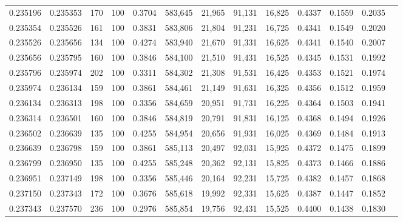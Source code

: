 \begin{tabular}{rrrrrrrrrrrrr}
0.235196 & 0.235353 &   170 & 100 &                                     0.3704 & 583,645 &  21,965 &  91,131 &  16,825 & 0.4337 & 0.1559 & 0.2035 \\
0.235354 & 0.235526 &   161 & 100 &                                     0.3831 & 583,806 &  21,804 &  91,231 &  16,725 & 0.4341 & 0.1549 & 0.2020 \\
0.235526 & 0.235656 &   134 & 100 &                                     0.4274 & 583,940 &  21,670 &  91,331 &  16,625 & 0.4341 & 0.1540 & 0.2007 \\
0.235656 & 0.235795 &   160 & 100 &                                     0.3846 & 584,100 &  21,510 &  91,431 &  16,525 & 0.4345 & 0.1531 & 0.1992 \\
0.235796 & 0.235974 &   202 & 100 &                                     0.3311 & 584,302 &  21,308 &  91,531 &  16,425 & 0.4353 & 0.1521 & 0.1974 \\
0.235974 & 0.236134 &   159 & 100 &                                     0.3861 & 584,461 &  21,149 &  91,631 &  16,325 & 0.4356 & 0.1512 & 0.1959 \\
0.236134 & 0.236313 &   198 & 100 &                                     0.3356 & 584,659 &  20,951 &  91,731 &  16,225 & 0.4364 & 0.1503 & 0.1941 \\
0.236314 & 0.236501 &   160 & 100 &                                     0.3846 & 584,819 &  20,791 &  91,831 &  16,125 & 0.4368 & 0.1494 & 0.1926 \\
0.236502 & 0.236639 &   135 & 100 &                                     0.4255 & 584,954 &  20,656 &  91,931 &  16,025 & 0.4369 & 0.1484 & 0.1913 \\
0.236639 & 0.236798 &   159 & 100 &                                     0.3861 & 585,113 &  20,497 &  92,031 &  15,925 & 0.4372 & 0.1475 & 0.1899 \\
0.236799 & 0.236950 &   135 & 100 &                                     0.4255 & 585,248 &  20,362 &  92,131 &  15,825 & 0.4373 & 0.1466 & 0.1886 \\
0.236951 & 0.237149 &   198 & 100 &                                     0.3356 & 585,446 &  20,164 &  92,231 &  15,725 & 0.4382 & 0.1457 & 0.1868 \\
0.237150 & 0.237343 &   172 & 100 &                                     0.3676 & 585,618 &  19,992 &  92,331 &  15,625 & 0.4387 & 0.1447 & 0.1852 \\
0.237343 & 0.237570 &   236 & 100 &                                     0.2976 & 585,854 &  19,756 &  92,431 &  15,525 & 0.4400 & 0.1438 & 0.1830 \\

\end{tabular}
